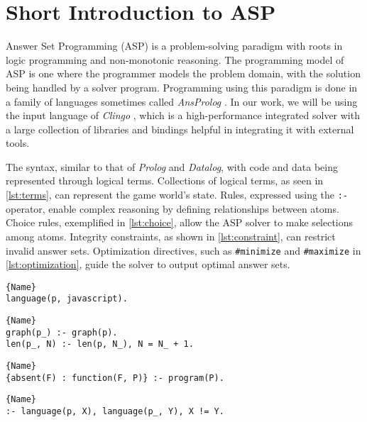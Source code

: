 \chapter{Short Introduction to ASP}

Answer Set Programming (ASP) \cite{Gelfond_2000, Eiter_2009} is a problem-solving paradigm with roots in logic programming and non-monotonic reasoning.
The programming 
model of ASP is one where the programmer models
the problem domain, with the solution being handled by a solver program.
Programming using this paradigm is done in a family of languages sometimes called \textit{AnsProlog} \cite{Gelfond_2002}.
In our work, we will be using the input language of \textit{Clingo} \cite{DBLP:journals/corr/GebserKKS14}, which 
is a high-performance integrated solver with a large collection of libraries and bindings helpful in integrating it with external tools.

The syntax, similar to that of \textit{Prolog} and \textit{Datalog}, with code and data being represented
through logical terms. Collections of logical terms, as seen in
\cref{lst:terms}, can represent the game world's state. Rules, expressed using
the \texttt{:-} operator, enable complex reasoning by defining relationships
between atoms. Choice rules, exemplified in \cref{lst:choice}, allow the ASP
solver to make selections among atoms. Integrity constraints, as shown in
\cref{lst:constraint}, can restrict invalid answer sets. Optimization
directives, such as \texttt{\#minimize} and \texttt{\#maximize} in
\cref{lst:optimization}, guide the solver to output optimal answer sets.

\begin{lstlisting}[caption={A set of facts over a program.}, label=lst:terms]{Name}
language(p, javascript).

\end{lstlisting}

\begin{lstlisting}[caption={Logic rules describing relationships between the original and regenerated program.}]{Name}
graph(p_) :- graph(p).
len(p_, N) :- len(p, N_), N = N_ + 1.
\end{lstlisting}

\begin{lstlisting}[caption={A choice rule.}, label=lst:choice]{Name}
{absent(F) : function(F, P)} :- program(P).
\end{lstlisting}

\begin{lstlisting}[caption={An integrity constraint.}, label=lst:constraint]{Name}
:- language(p, X), language(p_, Y), X != Y.
\end{lstlisting}

